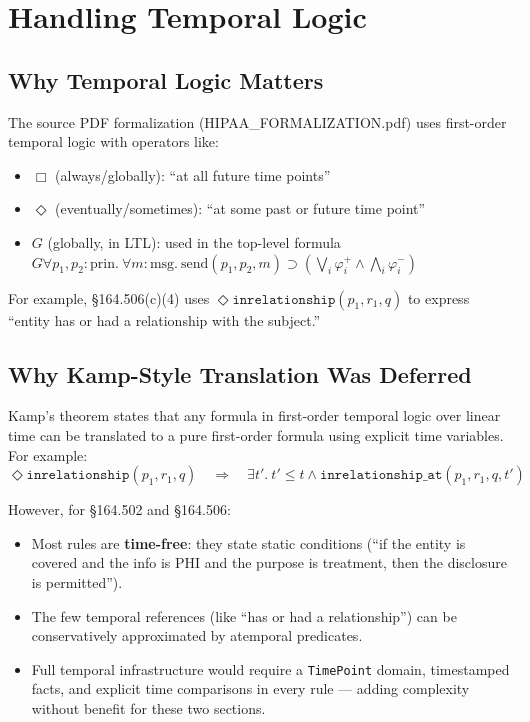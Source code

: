 \documentclass[11pt,letterpaper]{article}
\begin{document}
\section{Handling Temporal Logic}
\label{sec:temporal}

\subsection{Why Temporal Logic Matters}

The source PDF formalization (HIPAA\_FORMALIZATION.pdf) uses first-order temporal logic with operators like:
\begin{itemize}
  \item $\Box$ (always/globally): ``at all future time points''
  \item $\Diamond$ (eventually/sometimes): ``at some past or future time point''
  \item $G$ (globally, in LTL): used in the top-level formula $G \forall p_1, p_2 : \text{prin}.\ \forall m : \text{msg}.\ \text{send}(p_1, p_2, m) \supset (\bigvee_i \varphi^+_i \wedge \bigwedge_i \varphi^-_i)$
\end{itemize}

For example, \S 164.506(c)(4) uses $\Diamond\texttt{inrelationship}(p_1, r_1, q)$ to express ``entity has or had a relationship with the subject.''

\subsection{Why Kamp-Style Translation Was Deferred}

Kamp's theorem states that any formula in first-order temporal logic over linear time can be translated to a pure first-order formula using explicit time variables. For example:
\[
\Diamond\texttt{inrelationship}(p_1, r_1, q) \quad\Longrightarrow\quad \exists t'.\ t' \leq t \wedge \texttt{inrelationship\_at}(p_1, r_1, q, t')
\]

However, for \S 164.502 and \S 164.506:
\begin{itemize}
  \item Most rules are \textbf{time-free}: they state static conditions (``if the entity is covered and the info is PHI and the purpose is treatment, then the disclosure is permitted'').
  \item The few temporal references (like ``has or had a relationship'') can be conservatively approximated by atemporal predicates.
  \item Full temporal infrastructure would require a \texttt{TimePoint} domain, timestamped facts, and explicit time comparisons in every rule --- adding complexity without benefit for these two sections.
\end{itemize}
\end{document}
